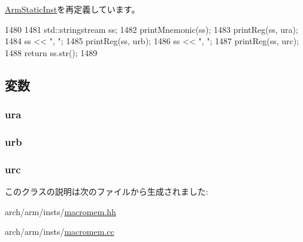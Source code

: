 \hyperlink{classArmISA_1_1ArmStaticInst_a95d323a22a5f07e14d6b4c9385a91896}{ArmStaticInst}を再定義しています。


\begin{DoxyCode}
1480 {
1481     std::stringstream ss;
1482     printMnemonic(ss);
1483     printReg(ss, ura);
1484     ss << ", ";
1485     printReg(ss, urb);
1486     ss << ", ";
1487     printReg(ss, urc);
1488     return ss.str();
1489 }
\end{DoxyCode}


\subsection{変数}
\hypertarget{classArmISA_1_1MicroIntOp_a8e6cd3e234a4950e7a1a05f1b24cfee0}{
\subsubsection[{ura}]{ {\bf ura}}}
\label{classArmISA_1_1MicroIntOp_a8e6cd3e234a4950e7a1a05f1b24cfee0}
\hypertarget{classArmISA_1_1MicroIntOp_a3771d4e6da84a09dbf436d6b1af2be46}{
\subsubsection[{urb}]{ {\bf urb}}}
\label{classArmISA_1_1MicroIntOp_a3771d4e6da84a09dbf436d6b1af2be46}
\hypertarget{classArmISA_1_1MicroIntOp_a7b2bf3346575e8b24bdd921acf571967}{
\subsubsection[{urc}]{ {\bf urc}}}
\label{classArmISA_1_1MicroIntOp_a7b2bf3346575e8b24bdd921acf571967}


このクラスの説明は次のファイルから生成されました:\begin{DoxyCompactItemize}
\item 
arch/arm/insts/\hyperlink{macromem_8hh}{macromem.hh}\item 
arch/arm/insts/\hyperlink{macromem_8cc}{macromem.cc}\end{DoxyCompactItemize}
